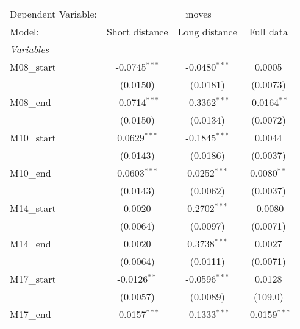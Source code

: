 \documentclass[10pt,a4paper]{article}
\author{Peer Lasse Hinrichsen}
\begin{document}
\begingroup
\centering
\begin{tabular}{l c c c}
   \tabularnewline \midrule \midrule
   Dependent Variable: & \multicolumn{3}{c}{moves}\\
   Model:                                           & Short distance        & Long distance  		& Full data\\  
   \midrule
   \emph{Variables}\\
   
   M08\_start                                       & -0.0745$^{***}$ 		& -0.0480$^{***}$			& 0.0005\\   
                                                    & (0.0150) 				& (0.0181)					& (0.0073)\\     
   M08\_end                                         & -0.0714$^{***}$		& -0.3362$^{***}$			& -0.0164$^{**}$\\
                                                    & (0.0150)				& (0.0134)					& (0.0072)\\  
   M10\_start                                       & 0.0629$^{***}$			& -0.1845$^{***}$			& 0.0044\\    
                                                    & (0.0143)				& (0.0186)					& (0.0037)\\   
   M10\_end                                         & 0.0603$^{***}$			& 0.0252$^{***}$			& 0.0080$^{**}$\\    
                                                    & (0.0143)				& (0.0062)					& (0.0037)\\    
   M14\_start                                       & 0.0020					& 0.2702$^{***}$			& -0.0080\\  
                                                    & (0.0064)				& (0.0097)					& (0.0071)\\  
   M14\_end                                         & 0.0020					& 0.3738$^{***}$			& 0.0027\\    
                                                    & (0.0064)				& (0.0111)					& (0.0071)\\   
   M17\_start                                       & -0.0126$^{**}$			& -0.0596$^{***}$			& 0.0128\\  
                                                    & (0.0057)				& (0.0089)					& (109.0)\\   
   M17\_end                                         & -0.0157$^{***}$		& -0.1333$^{***}$			& -0.0159$^{***}$\\    

\end{tabular}
\end{document}
